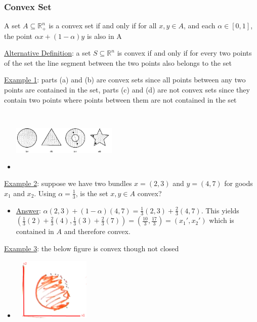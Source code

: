 \documentclass{article}
\begin{document}
\subsubsection{Convex Set}
A set $A \subseteq \mathbb{R}_{+}^{n}$ is a convex set if and only if for all $x, y \in A$, and each $\alpha \in [0,1]$, the point $\alpha x + (1- \alpha)y$ is also in A \par \vspace{0.3em}
  \underline{Alternative Definition}: a set $S \subseteq \mathbb{R}^{n}$ is convex if and only if for every two points of the set the line segment between the two points also belongs to the set
  \par
  \underline{Example 1}: parts (a) and (b) are convex sets since all points between any two points are contained in the set, parts (c) and (d) are not convex sets since they contain two points where points between them are not contained in the set
  \begin{itemize}
    \item  \includegraphics[width=5cm, height=3cm]{pic8}
  \end{itemize}
  \par
  \underline{Example 2}: suppose we have two bundles $x = (2,3)$ and $y = (4,7)$ for goods $x_{1}$ and $x_{2}$. Using $\alpha = \tfrac{1}{3}$, is the set $x, y \in A$ convex?
  \begin{itemize}
    \item  \underline{Answer}: $\alpha (2,3) + (1- \alpha)(4,7) = \tfrac{1}{3}(2,3) + \tfrac{2}{3}(4,7)$. This yields $(\tfrac{1}{3}(2) + \tfrac{2}{3}(4), \tfrac{1}{3}(3) + \tfrac{2}{3}(7)) = (\tfrac{10}{3}, \tfrac{17}{3}) = (x_{1}', x_{2}')$ which is contained in $A$ and therefore convex.
  \end{itemize}
  \par
  \underline{Example 3}: the below figure is convex though not closed
  \begin{itemize}
    \item  \includegraphics[width=4cm, height=3cm]{pic14}
  \end{itemize}
\end{document}
